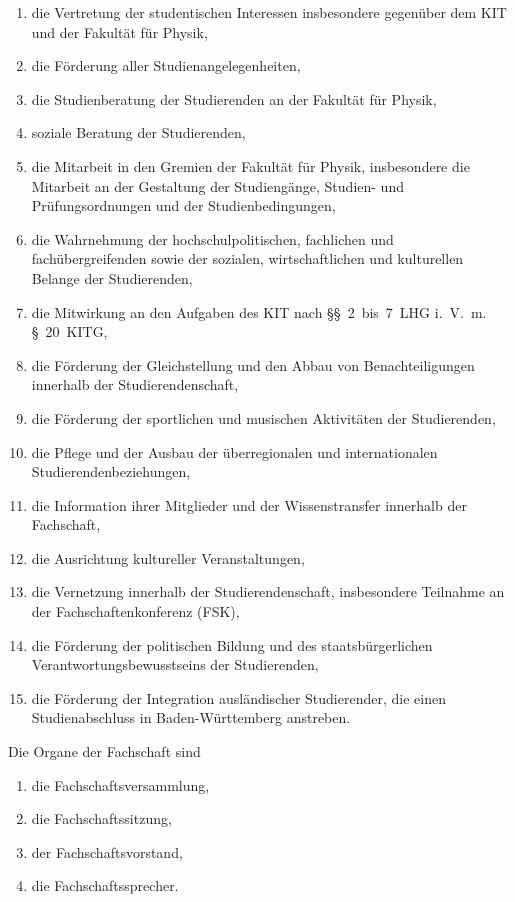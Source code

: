 \documentclass[a4paper, parskip=half, numbers=noenddot]{scrartcl}
\begin{document}
\begin{contract}
\begin{enumerate}
\item die Vertretung der studentischen Interessen insbesondere gegenüber dem KIT und der Fakultät für Physik,
\item die Förderung aller Studienangelegenheiten,
\item die Studienberatung der Studierenden an der Fakultät für Physik,
\item soziale Beratung der Studierenden,
\item die Mitarbeit in den Gremien der Fakultät für Physik, insbesondere die Mitarbeit an der Gestaltung der Studiengänge, Studien- und Prüfungsordnungen und der Studienbedingungen,
\item die Wahrnehmung der hochschulpolitischen, fachlichen und fachübergreifenden sowie der sozialen, wirtschaftlichen und kulturellen Belange der Studierenden,
\item die Mitwirkung an den Aufgaben des KIT nach §§~2~bis~7~LHG i.~V.~m. §~20~KITG,
\item die Förderung der Gleichstellung und den Abbau von Benachteiligungen innerhalb der Studierendenschaft,
\item die Förderung der sportlichen und musischen Aktivitäten der Studierenden,
\item die Pflege und der Ausbau der überregionalen und internationalen Studierendenbeziehungen,
\item die Information ihrer Mitglieder und der Wissenstransfer innerhalb der Fachschaft,
\item die Ausrichtung kultureller Veranstaltungen,
\item die Vernetzung innerhalb der Studierendenschaft, insbesondere Teilnahme an der Fachschaftenkonferenz (FSK),
\item die Förderung der politischen Bildung und des staatsbürgerlichen Verantwortungsbewusstseins der Studierenden,
\item die Förderung der Integration ausländischer Studierender, die einen Studienabschluss in Baden-Württemberg anstreben.
\end{enumerate}


\pagebreak

%
%


Die Organe der Fachschaft sind

  \begin{enumerate}
  \item die Fachschaftsversammlung,
  \item die Fachschaftssitzung,
  \item der Fachschaftsvorstand,
  \item die Fachschaftssprecher.
  \end{enumerate}



\end{contract}
\end{document}
